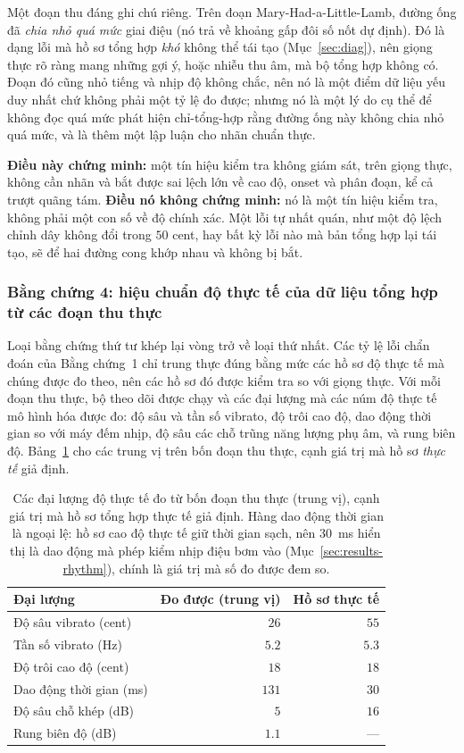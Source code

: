 \documentclass[12pt,a4paper]{article}
\begin{document}
Một đoạn thu đáng ghi chú riêng. Trên đoạn Mary-Had-a-Little-Lamb, đường ống đã
\emph{chia nhỏ quá mức} giai điệu (nó trả về khoảng gấp đôi số nốt dự định). Đó là
dạng lỗi mà hồ sơ tổng hợp \emph{khó} không thể tái tạo (Mục~\ref{sec:diag}), nên
giọng thực rõ ràng mang những gợi ý, hoặc nhiễu thu âm, mà bộ tổng hợp không có.
Đoạn đó cũng nhỏ tiếng và nhịp độ không chắc, nên nó là một điểm dữ liệu yếu duy
nhất chứ không phải một tỷ lệ đo được; nhưng nó là một lý do cụ thể để không đọc quá
mức phát hiện chỉ-tổng-hợp rằng đường ống này không chia nhỏ quá mức, và là thêm một
lập luận cho nhãn chuẩn thực.

\textbf{Điều này chứng minh:} một tín hiệu kiểm tra không giám sát, trên giọng thực,
không cần nhãn và bắt được sai lệch lớn về cao độ, onset và phân đoạn, kể cả trượt
quãng tám. \textbf{Điều nó không chứng minh:} nó là một tín hiệu kiểm tra, không
phải một con số về độ chính xác. Một lỗi tự nhất quán, như một độ lệch chỉnh dây
không đổi trong $50$ cent, hay bất kỳ lỗi nào mà bản tổng hợp lại tái tạo, sẽ để hai
đường cong khớp nhau và không bị bắt.

\subsubsection{Bằng chứng 4: hiệu chuẩn độ thực tế của dữ liệu tổng hợp từ các đoạn
thu thực}
\label{sec:calib}

Loại bằng chứng thứ tư khép lại vòng trở về loại thứ nhất. Các tỷ lệ lỗi chẩn đoán
của Bằng chứng~1 chỉ trung thực đúng bằng mức các hồ sơ độ thực tế mà chúng được đo
theo, nên các hồ sơ đó được kiểm tra so với giọng thực. Với mỗi đoạn thu thực, bộ
theo dõi được chạy và các đại lượng mà các núm độ thực tế mô hình hóa được đo: độ
sâu và tần số vibrato, độ trôi cao độ, dao động thời gian so với máy đếm nhịp, độ sâu
các chỗ trũng năng lượng phụ âm, và rung biên độ. Bảng~\ref{tab:calib} cho các trung
vị trên bốn đoạn thu thực, cạnh giá trị mà hồ sơ \emph{thực tế} giả định.

\begin{table}[H]
\centering
\caption{Các đại lượng độ thực tế đo từ bốn đoạn thu thực (trung vị), cạnh giá trị
mà hồ sơ tổng hợp thực tế giả định. Hàng dao động thời gian là ngoại lệ: hồ sơ cao
độ thực tế giữ thời gian sạch, nên $30$~ms hiển thị là dao động mà phép kiểm nhịp
điệu bơm vào (Mục~\ref{sec:results-rhythm}), chính là giá trị mà số đo được đem so.}
\label{tab:calib}
\begin{tabular}{l r r}
\toprule
\textbf{Đại lượng} & \textbf{Đo được (trung vị)} & \textbf{Hồ sơ thực tế} \\
\midrule
Độ sâu vibrato (cent) & $26$  & $55$ \\
Tần số vibrato (Hz)   & $5.2$ & $5.3$ \\
Độ trôi cao độ (cent) & $18$  & $18$ \\
Dao động thời gian (ms) & $131$ & $30$ \\
Độ sâu chỗ khép (dB)  & $5$   & $16$ \\
Rung biên độ (dB)     & $1.1$ & --- \\
\bottomrule
\end{tabular}
\end{table}
\end{document}

